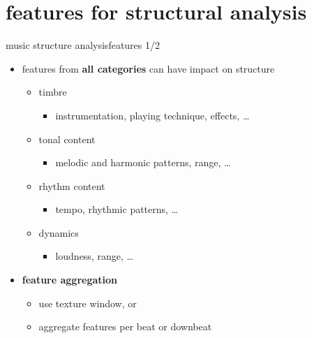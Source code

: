     \section[features]{features for structural analysis}
        \begin{frame}{music structure analysis}{features 1/2}
            \begin{itemize}
                \item   features from \textbf{all categories} can have impact on structure
                    \begin{itemize}
                        \item   timbre
                            \begin{itemize}
                                \item   instrumentation, playing technique, effects, \ldots
                            \end{itemize}
                        \item   tonal content
                            \begin{itemize}
                                \item   melodic and harmonic patterns, range, \ldots
                            \end{itemize}
                        \item   rhythm content
                            \begin{itemize}
                                \item   tempo, rhythmic patterns, \ldots
                            \end{itemize}
                        \item   dynamics
                            \begin{itemize}
                                \item   loudness, range, \ldots
                            \end{itemize}
                    \end{itemize}
               \bigskip
               \item<2->    \textbf{feature aggregation}
                \begin{itemize}
                    \item   use texture window, or
                    \item   aggregate features per beat or downbeat
                \end{itemize}
            \end{itemize}
        \end{frame}
